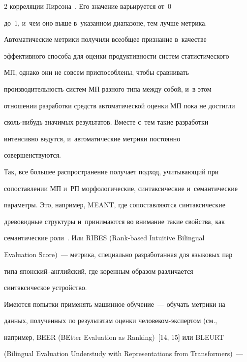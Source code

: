 \begin{multicols}{2}
корреляции Пирсона~\cite[с.~61]{10-nur}. Его значение варьируется от~0 


до~1, и~чем оно выше в~указанном диапазоне, тем лучше метрика.


  


  Автоматические метрики получили всеобщее признание в~качестве 


эффективного способа для оценки продуктивности систем статистического 


МП, однако они не совсем приспособлены, чтобы сравнивать 


производительность систем МП разного типа между собой, и~в этом 


отношении разработки средств автоматической оценки МП пока не достигли 


сколь-нибудь значимых результатов. Вместе с~тем такие разработки 


интенсивно ведутся, и~автоматические метрики постоянно 


совершенствуются.


  


  Так, все большее распространение получает подход, учитывающий при 


сопоставлении МП и~РП морфологические, синтаксические и~семантические 


параметры. Это, например, MEANT, где сопоставляются синтаксические 


древовидные структуры и~принимаются во внимание такие свойства, как 


семантические роли~\cite{13-nur}. Или RIBES (Rank-based Intuitive Bilingual 


Evaluation Score)~--- метрика, специально разработанная для языковых пар 


типа япон\-ский--анг\-лий\-ский, где коренным образом различается 


синтаксическое устройство.


  


  Имеются попытки применять машинное обуче\-ние~--- обучать метрики на 


данных, полученных по результатам оценки че\-ло\-ве\-ком-экс\-пер\-том (см., 


например, BEER (BEtter Evaluation as Ranking)~[14, 15] или \mbox{BLEURT} 


(Bilingual Evaluation Understudy with Representations from Transformers)~--- 



\end{multicols}
